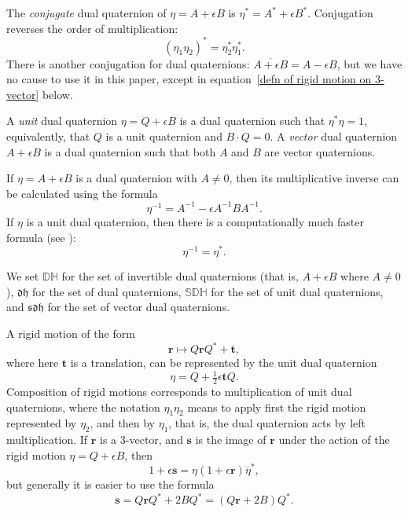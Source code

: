 \documentclass[reqno,12pt]{amsart}
\newcommand\setinvertibledualquat{\mathbb D\mathbb H}
\newcommand\setdualquat{\mathfrak d \mathfrak h}
\newcommand\setunitdualquat{\mathbb S\mathbb D\mathbb H}
\newcommand\setvectordualquat{\mathfrak{s}\mathfrak d \mathfrak h}
\begin{document}
The \emph{conjugate} dual quaternion of $\eta = A + \epsilon B$ is $\eta^* = A^* + \epsilon B^*$.  Conjugation reverses the order of multiplication:
\begin{equation}
(\eta_1\eta_2)^* = \eta_2^* \eta_1^* .
\end{equation}
There is another conjugation for dual quaternions: $\overline{A + \epsilon B} = A - \epsilon B$, but we have no cause to use it in this paper, except in equation~\eqref{defn of rigid motion on 3-vector} below.

A \emph{unit} dual quaternion $\eta = Q + \epsilon B$ is a dual quaternion such that $\eta^*\eta = 1$, equivalently, that $Q$ is a unit quaternion and $B \cdot Q = 0$.  A \emph{vector} dual quaternion $A + \epsilon B$ is a dual quaternion such that both $A$ and $B$ are vector quaternions.

If $\eta = A + \epsilon B$ is a dual quaternion with $A \ne 0$, then its multiplicative inverse can be calculated using the formula
\begin{equation}
\eta^{-1} = A^{-1} - \epsilon A^{-1} B A^{-1}.
\end{equation}
If $\eta$ is a unit dual quaternion, then there is a computationally much faster formula (see \cite{adorno}):
\begin{equation}
\label{inverse unit}
\eta^{-1} = \eta^*.
\end{equation}

We set $\setinvertibledualquat$ for the set of invertible dual quaternions (that is, $A +\epsilon B$ where $A \ne 0$), $\setdualquat$ for the set of dual quaternions, $\setunitdualquat$ for the set of unit dual quaternions, and $\setvectordualquat$ for the set of vector dual quaternions.

A rigid motion of the form
\begin{equation}
\label{rigid motion action}
\bm r \mapsto Q \bm r Q^* + \bm t,
\end{equation}
where here $\bm t$ is a translation, can be represented by the unit dual quaternion
\begin{equation}
\label{rigid motion as dual quaternion}
\eta = Q + \tfrac12 \epsilon \bm t Q.
\end{equation}
Composition of rigid motions corresponds to multiplication of unit dual quaternions, where the notation $\eta_1 \eta_2$ means to apply first the rigid motion represented by $\eta_2$, and then by $\eta_1$, that is, the dual quaternion acts by left multiplication.  If $\bm r$ is a 3-vector, and $\bm s$ is the image of $\bm r$ under the action of the rigid motion $\eta = Q + \epsilon B$, then
\begin{equation}
\label{defn of rigid motion on 3-vector}
1 + \epsilon \bm s = \eta (1 + \epsilon \bm r) \overline\eta^* ,
\end{equation}
but generally it is easier to use the formula
\begin{equation}
\label{rigid motion on 3-vector}
\bm s = Q \bm r Q^* + 2 B Q^* = (Q \bm r + 2 B) Q^* .
\end{equation}
\end{document}

